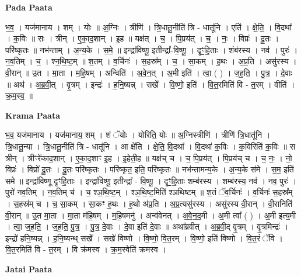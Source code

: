 \documentclass[17pt]{extarticle}
\begin{document}
\textbf{Pada Paata} \newline

भ॒व॒ । यज॑मानाय । शम् । योः ॥ अ॒ग्निः । त्रीणि॑ । त्रि॒धातू॒नीति॑ त्रि - धातू॑नि । एति॑ । क्षे॒ति॒ । वि॒दथा᳚ । क॒विः ॥ सः । त्रीन् । ए॒का॒द॒शान् । इ॒ह ॥ यक्ष॑त् । च॒ । पि॒प्रय॑त् । च॒ । नः॒ । विप्रः॑ । दू॒तः । परि॑ष्कृतः ॥ नभ॑न्ताम् । अ॒न्य॒के । स॒मे॒ ॥ इन्द्रा॑विष्णू॒ इतीन्द्रा᳚-वि॒ष्णू॒ । दृꣳ॒॒हि॒ताः । शंब॑रस्य । नव॑ । पुरः॑ । न॒व॒तिम् । च॒ । श्न॒थि॒ष्ट॒म् ॥ श॒तम् । व॒र्चिनः॑ । स॒हस्र᳚म् । च॒ । सा॒कम् । ह॒थः । अ॒प्र॒ति । असु॑रस्य । वी॒रान् ॥ उ॒त । मा॒ता । म॒हि॒षम् । अन्विति॑ । अ॒वे॒न॒त् । अ॒मी इति॑ । त्वा॒ ( ) । ज॒ह॒ति॒ । पु॒त्र॒ । दे॒वाः ॥ अथ॑ । अ॒ब्र॒वी॒त् । वृ॒त्रम् । इन्द्रः॑ । ह॒नि॒ष्यन्न् । सखे᳚ । वि॒ष्णो॒ इति॑ । वि॒त॒रमिति॑ वि - त॒रम् । वीति॑ । क्र॒म॒स्व॒ ॥  \newline


\textbf{Krama Paata} \newline

भ॒व॒ यज॑मानाय । यज॑मानाय॒ शम् । शं ॅयोः । योरिति॒ योः ॥ अ॒ग्निस्त्रीणि॑ । त्रीणि॑ त्रि॒धातू॑नि । त्रि॒धातू॒न्या । त्रि॒धातू॒नीति॑ त्रि - धातू॑नि । आ क्षे॑ति । क्षे॒ति॒ वि॒दथा᳚ । वि॒दथा॑ क॒विः । क॒विरिति॑ क॒विः ॥ स त्रीन् । त्रीꣳरे॑काद॒शान् । ए॒का॒द॒शाꣳ इ॒ह । इ॒हेती॒ह ॥ यक्ष॑च् च । च॒ पि॒प्रय॑त् । पि॒प्रय॑च् च । च॒ नः॒ । नो॒ विप्रः॑ । विप्रो॑ दू॒तः । दू॒तः परि॑ष्कृतः । परि॑ष्कृत॒ इति॒ परि॑ष्कृतः ॥ नभ॑न्तामन्य॒के । अ॒न्य॒के स॑मे । स॒म॒ इति॑ समे ॥ इन्द्रा॑विष्णू दृꣳहि॒ताः । इन्द्रा॑विष्णू॒ इतीन्द्रा᳚ - वि॒ष्णू॒ । दृꣳ॒॒हि॒ताः शम्ब॑रस्य । शम्ब॑रस्य॒ नव॑ । नव॒ पुरः॑ । पुरो॑ नव॒तिम् । न॒व॒तिम् च॑ । च॒ श्ञ॒थि॒ष्ट॒म् । श्ञ॒थि॒ष्ट॒मिति॑ श्ञथिष्टम् ॥ श॒तं ॅव॒र्चिनः॑ । व॒र्चिनः॑ स॒हस्र᳚म् । स॒हस्र॑म् च । च॒ सा॒कम् । सा॒कꣳ ह॒थः । ह॒थो अ॑प्र॒ति । अ॒प्र॒त्यसु॑रस्य । असु॑रस्य वी॒रान् । वी॒रानिति॑ वी॒रान् ॥ उ॒त मा॒ता । मा॒ता म॑हि॒षम् । म॒हि॒षमनु॑ । अन्व॑वेनत् । अ॒वे॒न॒द॒मी । अ॒मी त्वा᳚ ( ) । अ॒मी इत्य॒मी । त्वा॒ ज॒ह॒ति॒ । ज॒ह॒ति॒ पु॒त्र॒ । पु॒त्र॒ दे॒वाः । दे॒वा इति॑ दे॒वाः ॥ अथा᳚ब्रवीत् । अ॒ब्र॒वी॒द् वृ॒त्रम् । वृ॒त्रमिन्द्रः॑ । इन्द्रो॑ हनि॒ष्यन्न् । ह॒नि॒ष्यन्थ् सखे᳚ । सखे॑ विष्णो । वि॒ष्णो॒ वि॒त॒रम् । वि॒ष्णो॒ इति॑ विष्णो । वि॒त॒रं ॅवि । वि॒त॒रमिति॑ वि - त॒रम् । वि क्र॑मस्व । क्र॒म॒स्वेति॑ क्रमस्व । \newline

\textbf{Jatai Paata} \newline
\end{document}
